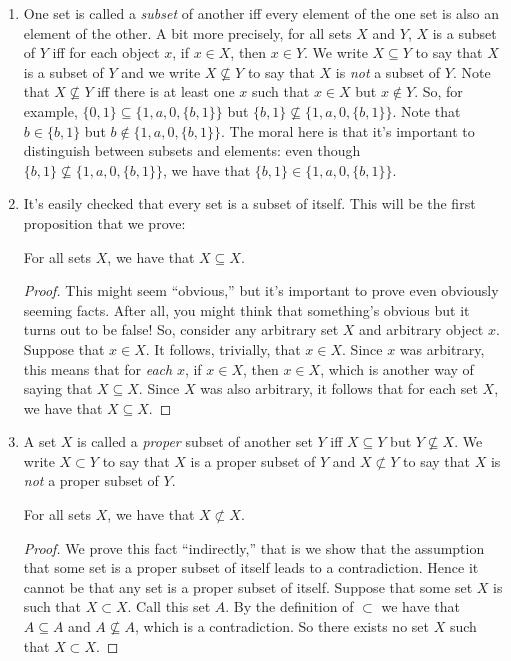 \begin{enumerate}[{\thesection}.1]

	
	\item One set is called a \emph{subset} of another iff every element of the one set is also an element of the other. A bit more precisely, for all sets $X$ and $Y$, $X$ is a subset of $Y$ iff for each object $x$, if $x\in X$, then $x\in Y$. We write $X\subseteq Y$ to say that $X$ is a subset of $Y$ and we write $X\nsubseteq Y$ to say that $X$ is \emph{not} a subset of $Y$. Note that $X\nsubseteq Y$ iff there is at least one $x$ such that $x\in X$ but $x\notin Y$. So, for example, $\{0,1\}\subseteq \{1,a,0,\{b,1\}\}$ but $\{b,1\}\nsubseteq \{1,a,0,\{b,1\}\}$. Note that $b\in \{b,1\}$ but $b\notin \{1,a,0,\{b,1\}\}$. The moral here is that it's important to distinguish between subsets and elements: even though $\{b,1\}\nsubseteq\{1,a,0,\{b,1\}\}$, we have that $\{b,1\}\in \{1,a,0,\{b,1\}\}$.
	
	\item 
	
	It's easily checked that every set is a subset of itself. This will be the first proposition that we prove:
\begin{proposition}
For all sets $X$, we have that $X\subseteq X$.
\end{proposition}
\begin{proof}
This might seem ``obvious,'' but it's important to prove even obviously seeming facts. After all, you might think that something's obvious but it turns out to be false! So, consider any arbitrary set $X$ and arbitrary object $x$. Suppose that $x\in X$. It follows, trivially, that $x\in X$. Since $x$ was arbitrary, this means that for \emph{each} $x$, if $x\in X$, then $x\in X$, which is another way of saying that $X\subseteq X$. Since $X$ was also arbitrary, it follows that for each set $X$, we have that $X\subseteq X$.
\end{proof}

	\item A set $X$ is called a \emph{proper} subset of another set $Y$ iff $X\subseteq Y$ but $Y\nsubseteq X$. We write $X\subset Y$ to say that $X$ is a proper subset of $Y$ and $X\not\subset Y$ to say that $X$ is \emph{not} a proper subset of $Y$. 	
	
\begin{proposition}
For all sets $X$, we have that $X\not\subset X$.
\end{proposition}
\begin{proof}
We prove this fact ``indirectly,'' that is we show that the assumption that some set is a proper subset of itself leads to a contradiction. Hence it cannot be that any set is a proper subset of itself. Suppose that some set $X$ is such that $X\subset X$. Call this set $A$. By the definition of $\subset$ we have that $A\subseteq A$ and $A\not\subseteq A$, which is a contradiction. So there exists no set $X$ such that $X\subset X$.
\end{proof}


\end{enumerate}
